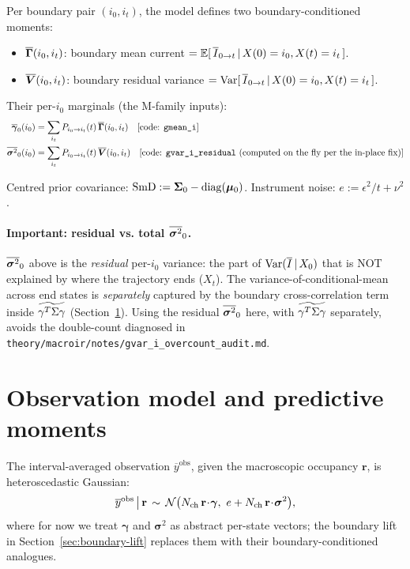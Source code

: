 \documentclass[11pt]{article}
\begin{document}
Per boundary pair $(i_0,i_t)$, the model defines two boundary-conditioned
moments:
\begin{itemize}
  \item $\overline{\boldsymbol{\Gamma}}(i_0,i_t)$: boundary mean current
        $= \mathbb{E}[\,\overline{I}_{0\to t}\,|\,X(0)=i_0, X(t)=i_t\,]$.
  \item $\overline{\boldsymbol{V}}(i_0,i_t)$: boundary residual variance
        $= \operatorname{Var}[\,\overline{I}_{0\to t}\,|\,X(0)=i_0, X(t)=i_t\,]$.
\end{itemize}

Their per-$i_0$ marginals (the M-family inputs):
\begin{align}
  \overline{\boldsymbol{\gamma}}_0(i_0)
  &= \sum_{i_t} P_{i_0\to i_t}(t)\,\overline{\boldsymbol{\Gamma}}(i_0,i_t)
   \quad\text{[code: \texttt{gmean\_i}]}\\
  \overline{\boldsymbol{\sigma}^2}_0(i_0)
  &= \sum_{i_t} P_{i_0\to i_t}(t)\,\overline{\boldsymbol{V}}(i_0,i_t)
   \quad\text{[code: \texttt{gvar\_i\_residual} (computed on the fly per the in-place fix)]}
\end{align}

Centred prior covariance: $\mathrm{SmD} := \boldsymbol{\Sigma}_0 - \operatorname{diag}(\boldsymbol{\mu}_0)$.
Instrument noise: $e := \epsilon^2/t + \nu^2$.

\paragraph{Important: residual vs. total $\overline{\boldsymbol{\sigma}^2}_0$.}
$\overline{\boldsymbol{\sigma}^2}_0$ above is the \emph{residual} per-$i_0$ variance: the part of
$\operatorname{Var}(\overline{I}\,|\,X_0)$ that is NOT explained by where the trajectory
ends ($X_t$). The variance-of-conditional-mean across end states is
\emph{separately} captured by the boundary cross-correlation term inside
$\widetilde{\gamma^{T}\Sigma\gamma}$ (Section~\ref{sec:predictive}). Using the residual $\overline{\boldsymbol{\sigma}^2}_0$
here, with $\widetilde{\gamma^{T}\Sigma\gamma}$ separately, avoids the double-count diagnosed in
\texttt{theory/macroir/notes/gvar\_i\_overcount\_audit.md}.

\section{Observation model and predictive moments}
\label{sec:predictive}

The interval-averaged observation $\overline{y}^{\mathrm{obs}}$, given the
macroscopic occupancy $\mathbf{r}$, is heteroscedastic Gaussian:
\begin{equation}
  \overline{y}^{\mathrm{obs}}\,\big|\,\mathbf{r}
  \,\sim\,
  \mathcal{N}\bigl(N_{\mathrm{ch}}\,\mathbf{r}\!\cdot\!\boldsymbol{\gamma},\
                   e + N_{\mathrm{ch}}\,\mathbf{r}\!\cdot\!\boldsymbol{\sigma}^2\bigr),
\end{equation}
where for now we treat $\boldsymbol{\gamma}$ and $\boldsymbol{\sigma}^2$ as
abstract per-state vectors; the boundary lift in
Section~\ref{sec:boundary-lift} replaces them with their boundary-conditioned
analogues.
\end{document}
